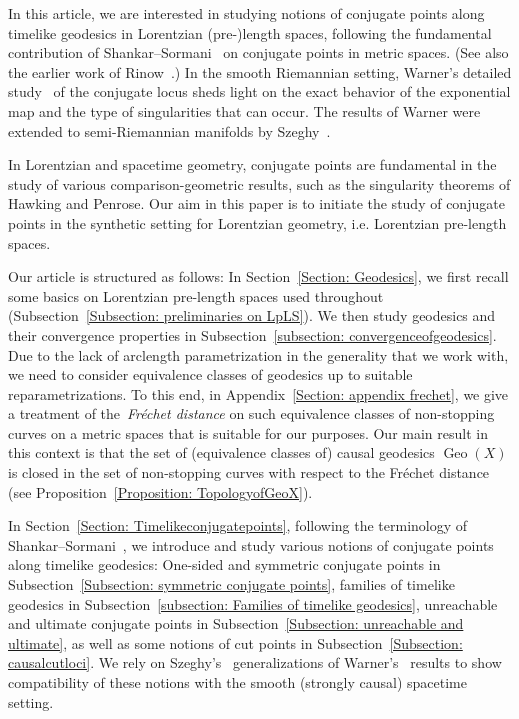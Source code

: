 \documentclass[a4paper,11pt]{article}
\numberwithin{equation}{section}
\theoremstyle{plain}
\theoremstyle{definition}
\DeclareMathOperator{\Geo}{Geo}
\begin{document}
In this article, we are interested in studying notions of conjugate points along timelike geodesics in Lorentzian (pre-)length spaces, 
following the fundamental contribution of Shankar--Sormani~\cite{shankar2009conjugate} on conjugate points in metric spaces. (See also the earlier work of Rinow~\cite{rinow1961innere}.) In the smooth Riemannian setting, Warner's detailed study~\cite{warner1965conjugate} of the conjugate locus sheds light on the exact behavior of the exponential map and the type of singularities that can occur. The results of Warner were extended to semi-Riemannian manifolds by Szeghy~\cite{szeghy2008conjugate}.

In Lorentzian and spacetime geometry, conjugate points are fundamental in the study of various comparison-geometric results, such as the singularity theorems of Hawking and Penrose. Our aim in this paper is to initiate the study of conjugate points in the synthetic setting for Lorentzian geometry, i.e. Lorentzian pre-length spaces. 

Our article is structured as follows: In Section~\ref{Section: Geodesics}, we first recall some basics on Lorentzian pre-length spaces used throughout (Subsection~\ref{Subsection: preliminaries on LpLS}). We then study geodesics and their convergence properties in Subsection~\ref{subsection: convergenceofgeodesics}. Due to the lack of arclength parametrization in the generality that we work with, we need to consider equivalence classes of geodesics up to suitable reparametrizations. To this end, in Appendix~\ref{Section: appendix frechet}, we give a treatment of the~\emph{Fr\'{e}chet distance\/} on such equivalence classes of non-stopping curves on a metric spaces that is suitable for our purposes. Our main result in this context is that the set of (equivalence classes of) causal geodesics $\Geo(X)$ is closed in the set of non-stopping curves with respect to the Fr\'{e}chet distance (see Proposition~\ref{Proposition: TopologyofGeoX}). 

In Section~\ref{Section: Timelikeconjugatepoints}, following the terminology of Shankar--Sormani~\cite{shankar2009conjugate}, we introduce and study various notions of conjugate points along timelike geodesics: One-sided and symmetric conjugate points in Subsection~\ref{Subsection: symmetric conjugate points}, families of timelike geodesics in Subsection~\ref{subsection: Families of timelike geodesics}, unreachable and ultimate conjugate points in Subsection~\ref{Subsection: unreachable and ultimate}, as well as some notions of cut points in Subsection~\ref{Subsection: causalcutloci}. We rely on Szeghy's~\cite{szeghy2008conjugate} generalizations of Warner's~\cite{warner1965conjugate} results to show compatibility of these notions with the smooth (strongly causal) spacetime setting.
\end{document}
